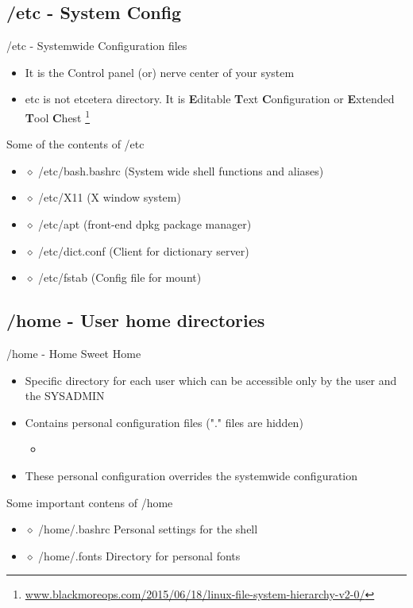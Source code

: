 \documentclass{beamer}
\newcommand{\insertcode}[2]{\begin{itemize}\item[]\end{itemize}} %
\begin{document}
\subsection{/etc - System Config}
\begin{frame}{/etc - Systemwide Configuration files}

\begin{itemize}
\item It is the Control panel (or) nerve center of your system
\pause
\item  etc is not etcetera directory. It is \textbf{E}ditable \textbf{T}ext \textbf{C}onfiguration or \textbf{E}xtended \textbf{T}ool \textbf{C}hest  \footnote{\url{www.blackmoreops.com/2015/06/18/linux-file-system-hierarchy-v2-0/}}
\end{itemize}
\pause
\begin{block}{Some of the contents of /etc}
\begin{itemize}
\item[] $\diamond$ /etc/bash.bashrc (System wide shell functions and aliases)
\item[] $\diamond$ /etc/X11 (X window system)
\item[] $\diamond$ /etc/apt (front-end dpkg package manager)
\item[] $\diamond$ /etc/dict.conf (Client for dictionary server)
\item[] $\diamond$ /etc/fstab (Config file for mount)
\end{itemize}

\end{block}
\end{frame}

\subsection{/home - User home directories}
\begin{frame}{/home - Home Sweet Home}

\begin{itemize}
\item Specific directory for each user which can be accessible only by the user and the SYSADMIN
\pause
\item Contains personal configuration files ("." files are hidden)
\insertcode{scripts/home_content.sh}{}
\item These personal configuration overrides the systemwide configuration
\end{itemize}

\begin{block}{Some important contens of /home}
\begin{itemize}
\item[] $\diamond$ /home/.bashrc Personal settings for the shell
\item[] $\diamond$ /home/.fonts Directory for personal fonts
\end{itemize}
\end{block}
\end{frame}
\end{document}

